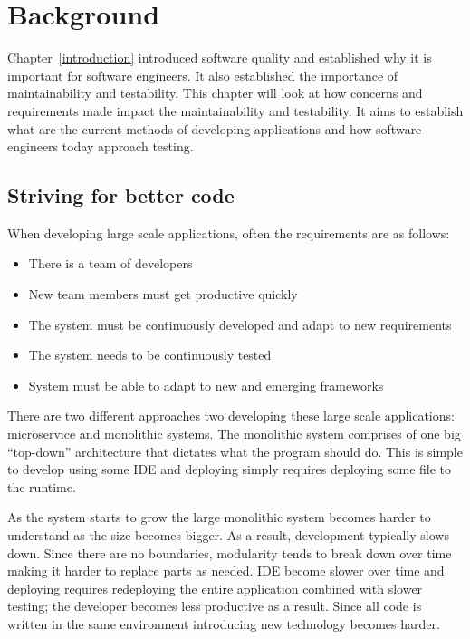 \chapter{Background}\label{background}

Chapter~\ref{introduction} introduced software quality and established why it
is important for software engineers. It also established the importance of
maintainability and testability. This chapter will look at how concerns and
requirements made impact the maintainability and testability. It aims to
establish what are the current methods of developing applications and how
software engineers today approach testing. 

\section{Striving for better code} 

When developing large scale applications, often the requirements are as follows:

\begin{itemize}
    \item There is a team of developers
    \item New team members must get productive quickly
    \item The system must be continuously developed and adapt to new
        requirements
    \item The system needs to be continuously tested
    \item System must be able to adapt to new and emerging frameworks
\end{itemize}

There are two different approaches two developing these large scale
applications: microservice and monolithic systems. The monolithic system
comprises of one big ``top-down'' architecture that dictates what the program
should do. This is simple to develop using some IDE and deploying simply requires
deploying some file to the runtime. 

As the system starts to grow the large monolithic system becomes harder to
understand as the size becomes bigger. As a result, development typically slows
down. Since there are no boundaries, modularity tends to break down over time
making it harder to replace parts as needed. IDE become slower over time and
deploying requires redeploying the entire application combined with slower
testing; the developer becomes less productive as a result. Since all code is
written in the same environment introducing new technology becomes harder.

